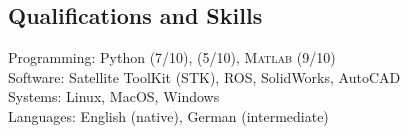 \subsection*{Qualifications and Skills}
{}

Programming: Python (7/10), \CC (5/10), \textsc{Matlab} (9/10) \\
Software: Satellite ToolKit (STK), ROS, SolidWorks, AutoCAD \\
Systems: Linux, MacOS, Windows \\
Languages: English (native), German (intermediate)
